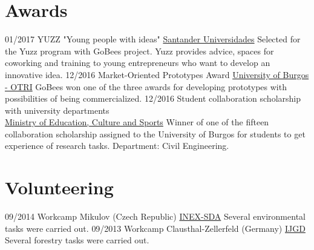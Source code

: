 \documentclass[]{friggeri-cv}
\begin{document}
\section{Awards}
\begin{entrylist}
  \entry
    {01/2017}
    {YUZZ "Young people with ideas"}
    {\href{http://yuzz.org.es/}{Santander Universidades}}
    {Selected for the Yuzz program with GoBees project. Yuzz provides advice, spaces for coworking and training to young entrepreneurs who want to develop an innovative idea.}
  \entry
    {12/2016}
    {Market-Oriented Prototypes Award}
    {\href{http://wwww.ubu.es/te-interesa/convocatoria-prototipos-orientados-al-mercado-curso-2016-2017}{University of Burgos - OTRI}}
    {GoBees won one of the three awards for developing prototypes with possibilities of being commercialized.}
  \entry
    {12/2016}
    {Student collaboration scholarship with university departments\\}
    {\href{http://www.mecd.gob.es/}{Ministry of Education, Culture and Sports}}
    {Winner of one of the fifteen collaboration scholarship assigned to the University of Burgos for students to get experience of research tasks. Department: Civil Engineering.}  
\end{entrylist}

\section{Volunteering}
\begin{entrylist}
  \entry
    {09/2014}
    {Workcamp Mikulov (Czech Republic)}
    {\href{https://www.inexsda.cz/}{INEX-SDA}}
    {Several environmental tasks were carried out.}
  \entry
    {09/2013}
    {Workcamp Clausthal-Zellerfeld (Germany)}
    {\href{http://www.ijgd.de/}{IJGD}}
    {Several forestry tasks were carried out.}
\end{entrylist}
\end{document}
